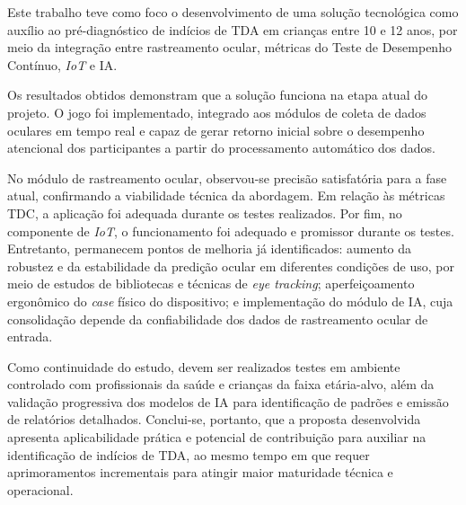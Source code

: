 Este trabalho teve como foco o desenvolvimento de uma solução tecnológica como auxílio ao pré-diagnóstico de indícios de TDA em crianças entre 10 e 12 anos, por meio da integração entre rastreamento ocular, métricas do Teste de Desempenho Contínuo, \textit{IoT} e IA.

Os resultados obtidos demonstram que a solução funciona na etapa atual do projeto. O jogo foi implementado, integrado aos módulos de coleta de dados oculares em tempo real e capaz de gerar retorno inicial sobre o desempenho atencional dos participantes a partir do processamento automático dos dados. 

No módulo de rastreamento ocular, observou-se precisão satisfatória para a fase atual, confirmando a viabilidade técnica da abordagem. Em relação às métricas TDC, a aplicação foi adequada durante os testes realizados. Por fim, no componente de \textit{IoT}, o funcionamento foi adequado e promissor durante os testes. Entretanto, permanecem pontos de melhoria já identificados: aumento da robustez e da estabilidade da predição ocular em diferentes condições de uso, por meio de estudos de bibliotecas e técnicas de \textit{eye tracking}; aperfeiçoamento ergonômico do \textit{case} físico do dispositivo; e implementação do módulo de IA, cuja consolidação depende da confiabilidade dos dados de rastreamento ocular de entrada.

Como continuidade do estudo, devem ser realizados testes em ambiente controlado com profissionais da saúde e crianças da faixa etária-alvo, além da validação progressiva dos modelos de IA para identificação de padrões e emissão de relatórios detalhados. Conclui-se, portanto, que a proposta desenvolvida apresenta aplicabilidade prática e potencial de contribuição para auxiliar na identificação de indícios de TDA, ao mesmo tempo em que requer aprimoramentos incrementais para atingir maior maturidade técnica e operacional.